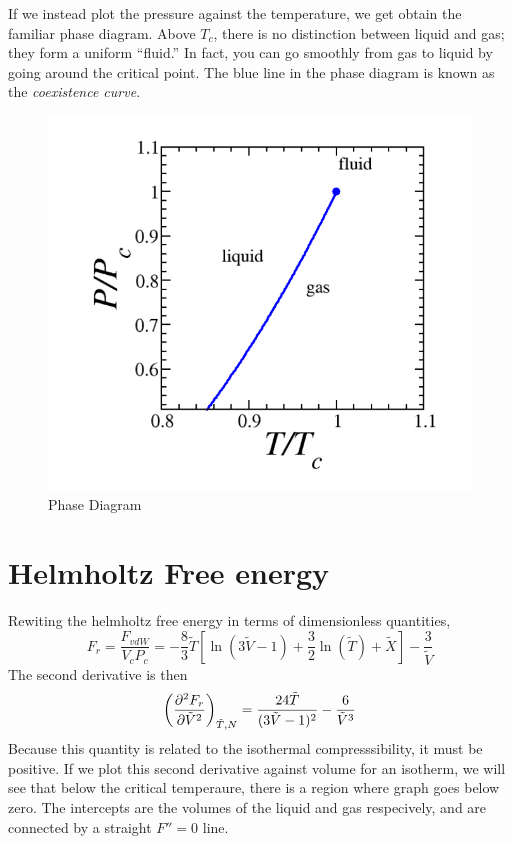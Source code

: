 If we instead plot the pressure against the temperature, we get obtain the familiar phase diagram. Above \(T_c\), there is no distinction between liquid and gas; they form a uniform ``fluid.'' In fact, you can go smoothly from gas to liquid by going around the critical point. The blue line in the phase diagram is known as the \emph{coexistence curve}.

\begin{figure}[!htbp]
	\begin{center}
		\includegraphics[scale=.4]{diagrams/phase/phase.png}
	\end{center}
	\caption{Phase Diagram}\label{fig16:phase}
\end{figure}

\section{Helmholtz Free energy}
Rewiting the helmholtz free energy in terms of dimensionless quantities,
\begin{equation}
	F_r = \frac{F_{vdW}}{V_cP_c} = -\frac{8}{3}\tilde T \left[\ln\left(3\tilde V-1\right)+\frac{3}{2}\ln\left(\tilde T\right)+\tilde X\right]-\frac{3}{\tilde V}
\end{equation}
The second derivative is then
\begin{equation}
	\left(\frac{\partial ^2F_r}{\partial \tilde V^2}\right)_{\tilde T, N}=\frac{24\tilde T}{(3\tilde V-1)^2}-\frac{6}{\tilde V^3}
\end{equation}
Because this quantity is related to the isothermal compresssibility, it must be positive. If we plot this second derivative against volume for an isotherm, we will see that below the critical temperaure, there is a region where graph goes below zero. The intercepts are the volumes of the liquid and gas respecively, and are connected by a straight \(F''=0\) line. 

